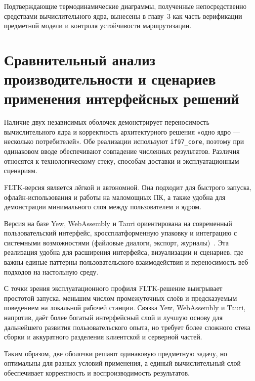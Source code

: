 Подтверждающие термодинамические диаграммы,
полученные непосредственно средствами вычислительного ядра,
вынесены в главу~3 как часть верификации предметной модели
и контроля устойчивости маршрутизации.

\section[Сравнительный анализ интерфейсных решений]{Сравнительный анализ производительности и сценариев применения интерфейсных решений}

Наличие двух независимых оболочек демонстрирует переносимость вычислительного ядра и корректность архитектурного решения «одно ядро --- несколько потребителей».  
Обе реализации используют \texttt{if97\_core}, поэтому при одинаковом вводе обеспечивают совпадение численных результатов.  
Различия относятся к технологическому стеку, способам доставки и эксплуатационным сценариям.  

	FLTK-версия является лёгкой и автономной.  
Она подходит для быстрого запуска, офлайн-использования и работы на маломощных ПК,
а также удобна для демонстрации минимального слоя между пользователем и ядром.  

	Версия на базе Yew, WebAssembly и Tauri ориентирована на современный пользовательский интерфейс,
	кроссплатформенную упаковку и интеграцию с системными возможностями (файловые диалоги, экспорт, журналы)~\cite{tauri_docs}.  
Эта реализация удобна для расширения интерфейса, визуализации и сценариев,
где важны единые паттерны пользовательского взаимодействия и переносимость веб-подходов на настольную среду.  

С точки зрения эксплуатационного профиля
	FLTK-решение выигрывает простотой запуска,
	меньшим числом промежуточных слоёв
	и предсказуемым поведением на локальной рабочей станции.
	Связка Yew, WebAssembly и Tauri, напротив,
	даёт более богатый интерфейсный слой
	и лучшую основу для дальнейшего развития пользовательского опыта,
	но требует более сложного стека сборки
	и аккуратного разделения клиентской и серверной частей.

Таким образом, две оболочки решают одинаковую предметную задачу,
но оптимальны для разных условий применения,
а единый вычислительный слой обеспечивает корректность и воспроизводимость результатов.  
